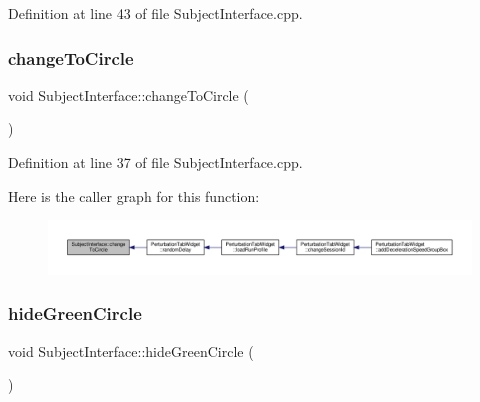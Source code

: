 Definition at line 43 of file Subject\+Interface.\+cpp.

\mbox{\label{class_subject_interface_a18da5ec27033f0af048203cecffb45e0}} 
\subsubsection{\texorpdfstring{change\+To\+Circle}{changeToCircle}}
{\footnotesize\ttfamily void Subject\+Interface\+::change\+To\+Circle (\begin{DoxyParamCaption}{ }\end{DoxyParamCaption})\hspace{0.3cm}{\ttfamily [slot]}}



Definition at line 37 of file Subject\+Interface.\+cpp.

Here is the caller graph for this function\+:
\nopagebreak
\begin{figure}[H]
\begin{center}
\leavevmode
\includegraphics[width=350pt]{class_subject_interface_a18da5ec27033f0af048203cecffb45e0_icgraph}
\end{center}
\end{figure}
\mbox{\label{class_subject_interface_a94f913d3a6bd8719617bcdd7950d7dba}} 
\subsubsection{\texorpdfstring{hide\+Green\+Circle}{hideGreenCircle}}
{\footnotesize\ttfamily void Subject\+Interface\+::hide\+Green\+Circle (\begin{DoxyParamCaption}{ }\end{DoxyParamCaption})\hspace{0.3cm}{\ttfamily [slot]}}



